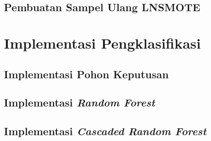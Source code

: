 	\subsection{Pembuatan Sampel Ulang LNSMOTE}
	\label{bab:03:sampel_ulang_lnsmote}
	

	\section{Implementasi Pengklasifikasi}
	

	\subsection{Implementasi Pohon Keputusan}
	\label{subsection:cart}
	

	\subsection{Implementasi \textit{Random Forest}}
	\label{subsection:implementasi_rf}
	

	\subsection{Implementasi \textit{Cascaded Random Forest}}
	\label{subsection:implementasi_crf}
	
